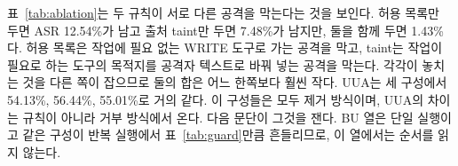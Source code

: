 \documentclass[acmsmall,screen,review,anonymous]{acmart}
\begin{document}
표~\ref{tab:ablation}는 두 규칙이 서로 다른 공격을 막는다는 것을 보인다. 허용 목록만 두면 ASR 12.54\%가 남고 출처 taint만 두면 7.48\%가 남지만, 둘을 함께 두면 1.43\%다. 허용 목록은 작업에 필요 없는 WRITE 도구로 가는 공격을 막고, taint는 작업이 필요로 하는 도구의 목적지를 공격자 텍스트로 바꿔 넣는 공격을 막는다. 각각이 놓치는 것을 다른 쪽이 잡으므로 둘의 합은 어느 한쪽보다 훨씬 작다. UUA는 세 구성에서 54.13\%, 56.44\%, 55.01\%로 거의 같다. 이 구성들은 모두 제거 방식이며, UUA의 차이는 규칙이 아니라 거부 방식에서 온다. 다음 문단이 그것을 잰다. BU 열은 단일 실행이고 같은 구성이 반복 실행에서 표~\ref{tab:guard}만큼 흔들리므로, 이 열에서는 순서를 읽지 않는다.
\end{document}
